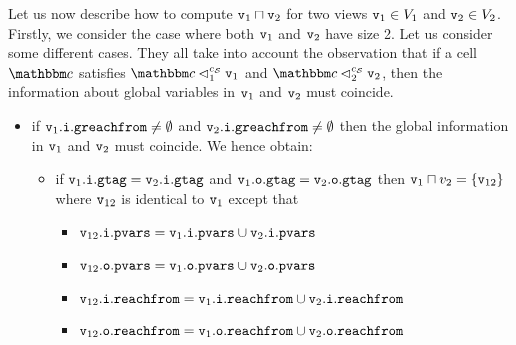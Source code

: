 Let us now describe how to compute  $\mathtt{v}_1 \sqcap \mathtt{v}_2$ for
two views $\mathtt{v}_1 \in V_1$ and $\mathtt{v}_2 \in V_2$.
Firstly, we consider the case where both $\mathtt{v}_1$ and $\mathtt{v}_2$ have size 2.
Let us consider some different cases.
They all take into account the  observation that if a cell $\cell$ satisfies
$\cell \satfrag{1}{\sconf} \frag_1$ and $\cell \satfrag{2}{\sconf} \frag_2$, then
the information about global variables in $\mathtt{v}_1$ and $\mathtt{v}_2$ must coincide.
 \begin{itemize}
 \item if $\mathtt{v}_1.\mathtt{i}.\mathtt{greachfrom} \neq \emptyset$ and $\mathtt{v}_2.\mathtt{i}.\mathtt{greachfrom} \neq \emptyset$ then the global information in $\mathtt{v}_1$ and $\mathtt{v}_2$ must coincide. We hence obtain:
  \begin{itemize}
  \item if $\mathtt{v}_1.\mathtt{i}.\mathtt{gtag} = \mathtt{v}_2.\mathtt{i}.\mathtt{gtag}$ and $\mathtt{v}_1.\mathtt{o}.\mathtt{gtag} = \mathtt{v}_2.\mathtt{o}.\mathtt{gtag}$ then $\mathtt{v}_1 \sqcap v_2 = \left\{\mathtt{v}_{12}\right\}$ where $\mathtt{v}_{12}$ is identical to $\mathtt{v}_1$ except that 
  \begin{itemize}
  \item $\mathtt{v}_{12}.\mathtt{i}.\mathtt{pvars} = \mathtt{v}_1.\mathtt{i}.\mathtt{pvars} \cup \mathtt{v}_2.\mathtt{i}.\mathtt{pvars}$ 
  \item  $\mathtt{v}_{12}.\mathtt{o}.\mathtt{pvars} = \mathtt{v}_1.\mathtt{o}.\mathtt{pvars} \cup \mathtt{v}_2.\mathtt{o}.\mathtt{pvars}$
  \item $\mathtt{v}_{12}.\mathtt{i}.\mathtt{reachfrom} = \mathtt{v}_{1}.\mathtt{i}.\mathtt{reachfrom} \cup \mathtt{v}_{2}.\mathtt{i}.\mathtt{reachfrom}$
   \item $\mathtt{v}_{12}.\mathtt{o}.\mathtt{reachfrom} = \mathtt{v}_{1}.\mathtt{o}.\mathtt{reachfrom} \cup \mathtt{v}_{2}.\mathtt{o}.\mathtt{reachfrom}$
    \end{itemize}
 \end{itemize}


\end{itemize}
